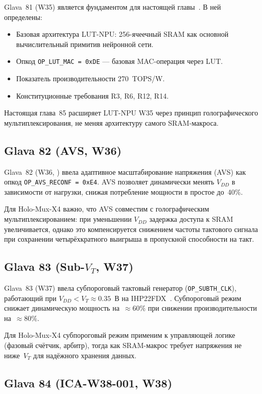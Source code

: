 Glava~81 (W35) является фундаментом для настоящей главы~\cite{trios882}.
В ней определены:
\begin{itemize}
  \item Базовая архитектура LUT-NPU: 256-ячеечный SRAM как основной
        вычислительный примитив нейронной сети.
  \item Опкод \texttt{OP\_LUT\_MAC = 0xDE} — базовая MAC-операция через LUT.
  \item Показатель производительности 270~TOPS/W.
  \item Конституционные требования R3, R6, R12, R14.
\end{itemize}

Настоящая глава~85 расширяет LUT-NPU W35 через принцип
голографического мультиплексирования, не меняя архитектуру
самого SRAM-макроса.

\subsection{Glava 82 (AVS, W36)}
\label{subsec:glava85-w36}

Glava~82 (W36, \cite{t27661}) ввела адаптивное масштабирование
напряжения (AVS) как опкод \texttt{OP\_AVS\_RECONF = 0xE4}.
AVS позволяет динамически менять $V_{DD}$ в зависимости от нагрузки,
снижая потребление мощности в простое до~40\%.

Для Holo-Mux-X4 важно, что AVS совместим с голографическим
мультиплексированием: при уменьшении $V_{DD}$ задержка доступа
к SRAM увеличивается, однако это компенсируется снижением частоты
тактового сигнала при сохранении четырёхкратного выигрыша
в пропускной способности на такт.

\subsection{Glava 83 (Sub-$V_T$, W37)}
\label{subsec:glava85-w37}

Glava~83 (W37) ввела субпороговый тактовый генератор
(\texttt{OP\_SUBTH\_CLK}), работающий при $V_{DD} < V_T \approx 0.35$~В
на IHP22FDX~\cite{trios875}.
Субпороговый режим снижает динамическую мощность на~$\approx 60\%$
при снижении производительности на~$\approx 80\%$.

Для Holo-Mux-X4 субпороговый режим применим к управляющей логике
(фазовый счётчик, арбитр), тогда как SRAM-макрос требует
напряжения не ниже~$V_T$ для надёжного хранения данных.

\subsection{Glava 84 (ICA-W38-001, W38)}
\label{subsec:glava85-w38}

